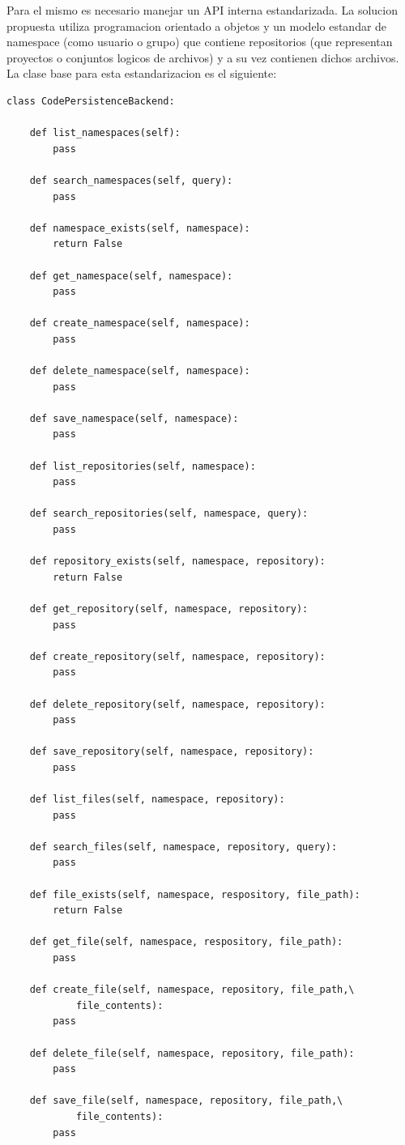Para el mismo es necesario manejar un API interna estandarizada. La solucion propuesta utiliza programacion orientado a objetos y un modelo estandar de namespace (como usuario o grupo) que contiene repositorios (que representan proyectos o conjuntos logicos de archivos) y a su vez contienen dichos archivos. La clase base para esta estandarizacion es el siguiente:
\lstset{language=Python}
\begin{lstlisting}
class CodePersistenceBackend:

    def list_namespaces(self):
        pass

    def search_namespaces(self, query):
        pass

    def namespace_exists(self, namespace):
        return False

    def get_namespace(self, namespace):
        pass

    def create_namespace(self, namespace):
        pass

    def delete_namespace(self, namespace):
        pass

    def save_namespace(self, namespace):
        pass

    def list_repositories(self, namespace):
        pass

    def search_repositories(self, namespace, query):
        pass

    def repository_exists(self, namespace, repository):
        return False

    def get_repository(self, namespace, repository):
        pass

    def create_repository(self, namespace, repository):
        pass

    def delete_repository(self, namespace, repository):
        pass

    def save_repository(self, namespace, repository):
        pass

    def list_files(self, namespace, repository):
        pass

    def search_files(self, namespace, repository, query):
        pass

    def file_exists(self, namespace, respository, file_path):
        return False

    def get_file(self, namespace, respository, file_path):
        pass

    def create_file(self, namespace, repository, file_path,\
            file_contents):
        pass

    def delete_file(self, namespace, repository, file_path):
        pass

    def save_file(self, namespace, repository, file_path,\
            file_contents):
        pass
\end{lstlisting}
\lstset{language=Bash}

